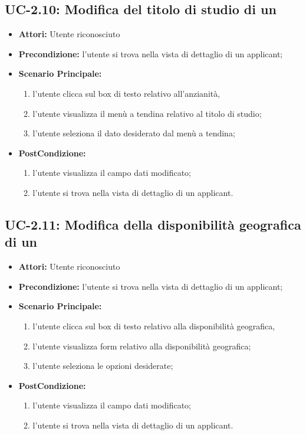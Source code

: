 \subsection{UC-2.10: Modifica del titolo di studio di un \applicant}
\begin{itemize}
	\item \textbf{Attori:} Utente riconosciuto
	\item \textbf{Precondizione:}  l'utente si trova nella vista di dettaglio di un applicant;
	\item \textbf{Scenario Principale:}
	\begin{enumerate}
		\item l'utente clicca sul box di testo relativo all'anzianità,
		\item l'utente visualizza il menù a tendina relativo al titolo di studio;
		\item l'utente seleziona il dato desiderato dal menù a tendina;
	\end{enumerate}
	\item \textbf{PostCondizione:} 
	\begin{enumerate}
		\item l'utente visualizza il campo dati modificato;
		\item l'utente si trova nella vista di dettaglio di un applicant.
	\end{enumerate}
	
\end{itemize}


\subsection{UC-2.11: Modifica della disponibilità geografica di un \applicant}
\begin{itemize}
	\item \textbf{Attori:} Utente riconosciuto
	\item \textbf{Precondizione:}  l'utente si trova nella vista di dettaglio di un applicant;
	\item \textbf{Scenario Principale:}
	\begin{enumerate}
		\item l'utente clicca sul box di testo relativo alla disponibilità geografica,
		\item l'utente visualizza form relativo alla disponibilità geografica;
		\item l'utente seleziona le opzioni desiderate;
	\end{enumerate}
	\item \textbf{PostCondizione:} 
	\begin{enumerate}
		\item l'utente visualizza il campo dati modificato;
		\item l'utente si trova nella vista di dettaglio di un applicant.
	\end{enumerate}
	
\end{itemize}

